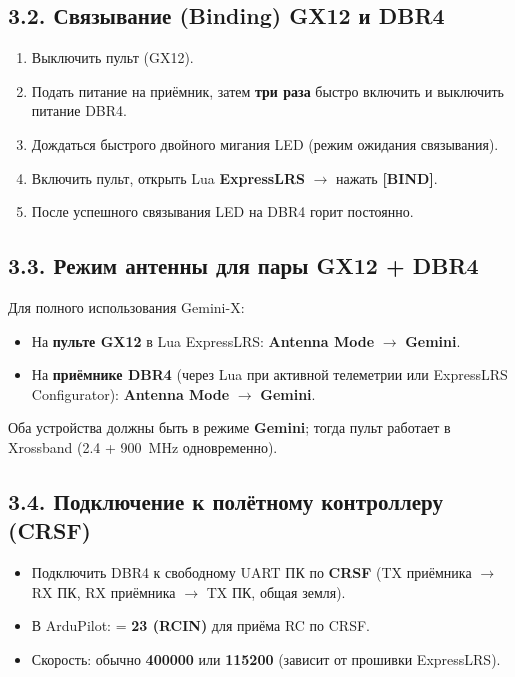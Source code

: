 \documentclass[a4paper,11pt]{article}
\begin{document}
\subsection{3.2. Связывание (Binding) GX12 и DBR4}

\begin{enumerate}[nosep]
  \item Выключить пульт (GX12).
  \item Подать питание на приёмник, затем \textbf{три раза} быстро включить и выключить питание DBR4.
  \item Дождаться быстрого двойного мигания LED (режим ожидания связывания).
  \item Включить пульт, открыть Lua \textbf{ExpressLRS} $\to$ нажать \textbf{[BIND]}.
  \item После успешного связывания LED на DBR4 горит постоянно.
\end{enumerate}

\subsection{3.3. Режим антенны для пары GX12 + DBR4}

Для полного использования Gemini-X:
\begin{itemize}[nosep]
  \item На \textbf{пульте GX12} в Lua ExpressLRS: \textbf{Antenna Mode} $\to$ \textbf{Gemini}.
  \item На \textbf{приёмнике DBR4} (через Lua при активной телеметрии или ExpressLRS Configurator): \textbf{Antenna Mode} $\to$ \textbf{Gemini}.
\end{itemize}

Оба устройства должны быть в режиме \textbf{Gemini}; тогда пульт работает в Xrossband (2.4 + 900~MHz одновременно).

\subsection{3.4. Подключение к полётному контроллеру (CRSF)}

\begin{itemize}[nosep]
  \item Подключить DBR4 к свободному UART ПК по \textbf{CRSF} (TX приёмника $\to$ RX ПК, RX приёмника $\to$ TX ПК, общая земля).
  \item В ArduPilot:  = \textbf{23 (RCIN)} для приёма RC по CRSF.
  \item Скорость: обычно \textbf{400000} или \textbf{115200} (зависит от прошивки ExpressLRS).
\end{itemize}
\end{document}
